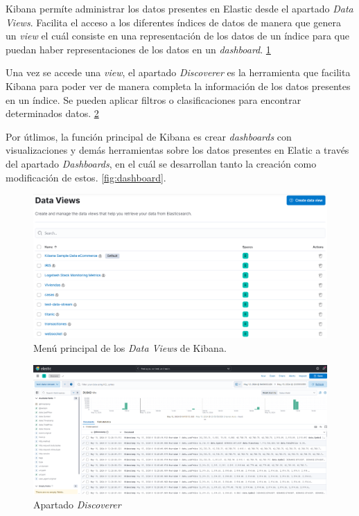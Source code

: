 Kibana permíte administrar los datos presentes en Elastic desde el apartado \textit{Data Views}. Facilita el acceso a los diferentes índices de datos de manera que genera un \textit{view} el cuál consiste en una representación de los datos de un índice para que puedan haber representaciones de los datos en un \textit{dashboard}. \ref{fig:dataviews}

Una vez se accede una \textit{view}, el apartado \textit{Discoverer} es la herramienta que facilita Kibana para poder ver de manera completa la información de los datos presentes en un índice. Se pueden aplicar filtros o clasificaciones para encontrar determinados datos. \ref{fig:discoverer}

Por útlimos, la función principal de Kibana es crear \textit{dashboards} con visualizaciones y demás herramientas sobre los datos presentes en Elatic a través del apartado \textit{Dashboards}, en el cuál se desarrollan tanto la creación como modificación de estos. \ref{fig:dashboard}.

\begin{figure}
    \centering
    \includegraphics[width=1\linewidth]{img/views.png}
    \caption{Menú principal de los \textit{Data Views} de Kibana.}
    \label{fig:dataviews}
\end{figure}

\begin{figure}
    \centering
    \includegraphics[width=1\linewidth]{img/discoverer.png}
    \caption{Apartado \textit{Discoverer}}
    \label{fig:discoverer}
\end{figure}

